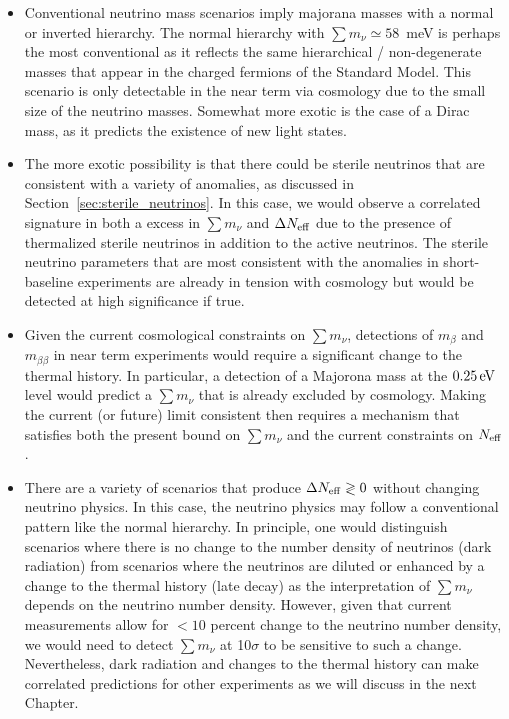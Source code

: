 \begin{itemize}
\item Conventional neutrino mass scenarios imply majorana masses with a normal or inverted hierarchy.  The normal hierarchy with $\sum m_\nu \simeq 58$~meV is perhaps the most conventional as it reflects the same hierarchical / non-degenerate masses that appear in the charged fermions of the Standard Model.  This scenario is only detectable in the near term via cosmology due to the small size of the neutrino masses.  Somewhat more exotic is the case of a Dirac mass, as it predicts the existence of new light states.

\item The more exotic possibility is that there could be sterile neutrinos that are consistent with a variety of anomalies, as discussed in Section~\ref{sec:sterile_neutrinos}.  In this case, we would observe a correlated signature in both a excess in $\sum m_\nu$ and $\Delta N_{\rm eff}$ due to the presence of thermalized sterile neutrinos in addition to the active neutrinos.  The sterile neutrino parameters that are most consistent with the anomalies in short-baseline experiments are already in tension with cosmology but would be detected at high significance if true.  

\item Given the current cosmological constraints on $\sum m_\nu$, detections of $m_\beta$ and $m_{\beta \beta}$ in near term experiments would require a significant change to the thermal history.  In particular, a detection of a Majorona mass at the $0.25 \, {\rm eV}$ level would predict a $\sum m_\nu$ that is already excluded by cosmology.  Making the current (or future) limit consistent then requires a mechanism that satisfies both the present bound on $\sum m_\nu$ and the current constraints on $N_{\rm eff}$.


\item There are a variety of scenarios that produce $\Delta N_{\rm eff}  \gtrless 0$ without changing neutrino physics.  In this case, the neutrino physics may follow a conventional pattern like the normal hierarchy.  In principle, one would distinguish scenarios where there is no change to the number density of neutrinos (dark radiation) from scenarios where the neutrinos are diluted or enhanced by a change to the thermal history (late decay) as the interpretation of $\sum m_\nu$ depends on the neutrino number density.  However, given that current measurements allow for $< 10$ percent change to the neutrino number density, we would need to detect $\sum m_\nu$ at 10$\sigma$ to be sensitive to such a change.  Nevertheless, dark radiation and changes to the thermal history can make correlated predictions for other experiments as we will discuss in the next Chapter.


\end{itemize}
